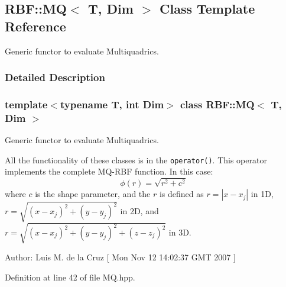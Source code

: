 \hypertarget{classRBF_1_1MQ}{
\subsection{RBF::MQ$<$ T, Dim $>$ Class Template Reference}
\label{classRBF_1_1MQ}
}
Generic functor to evaluate Multiquadrics.  




\subsubsection{Detailed Description}
\subsubsection*{template$<$typename T, int Dim$>$ class RBF::MQ$<$ T, Dim $>$}

Generic functor to evaluate Multiquadrics. 

All the functionality of these classes is in the {\tt operator()}. This operator implements the complete MQ-RBF function. In this case: \[ \phi(r) = \sqrt{r^2+c^2} \] where $ c $ is the shape parameter, and the $r$ is defined as $r = |x - x_j|$ in 1D, $r = \sqrt{(x - x_j)^2 + (y - y_j)^2} $ in 2D, and $r = \sqrt{(x - x_j)^2 + (y - y_j)^2 + (z - z_j)^2} $ in 3D.

\begin{Desc}
\item[Author:]Luis M. de la Cruz \mbox{[} Mon Nov 12 14:02:37 GMT 2007 \mbox{]} \end{Desc}


Definition at line 42 of file MQ.hpp.